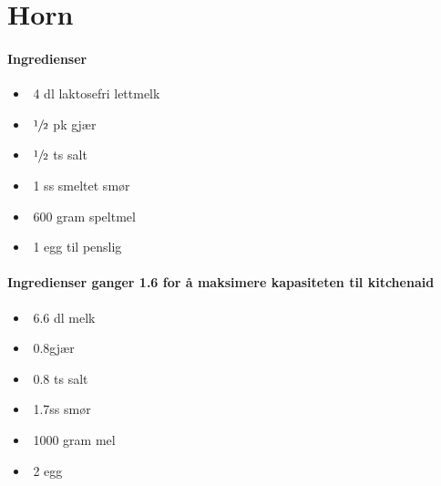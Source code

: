 \section{﻿Horn}


\paragraph{Ingredienser}
\begin{itemize}[noitemsep]
	\item﻿ 4 dl laktosefri lettmelk
	\item﻿ $\sfrac{1}{2}$ pk gjær
	\item﻿  $\sfrac{1}{2}$  ts salt
	\item﻿ 1 ss smeltet smør
	\item﻿ 600 gram speltmel
	\item﻿ 1 egg til penslig
\end{itemize}

\paragraph{Ingredienser ganger 1.6 for å maksimere kapasiteten til kitchenaid}
\begin{itemize}[noitemsep]
	\item﻿ 6.6 dl melk
	\item﻿ 0.8gjær
	\item﻿ 0.8 ts salt
	\item﻿ 1.7ss smør
	\item﻿ 1000 gram mel
	\item﻿ 2 egg
\end{itemize}

